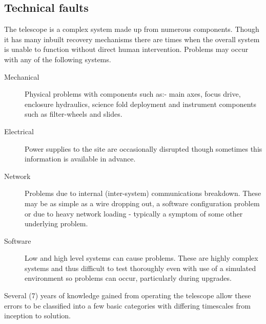 \subsection{Technical faults}
The telescope is a complex system made up from numerous components. Though it has many inbuilt recovery mechanisms there are times when the overall system is unable to function without direct human intervention. Problems may occur with any of the following systems.

\begin{description}
\item [Mechanical] Physical problems with components such as:- main axes, focus drive, enclosure hydraulics, science fold deployment and instrument components such as filter-wheels and slides.

\item [Electrical] Power supplies to the site are occasionally disrupted though sometimes this information is available in advance.

\item [Network] Problems due to internal (inter-system) communications breakdown. These may be as simple as a wire dropping out, a software configuration problem or due to heavy network loading - typically a symptom of some other underlying problem. 

\item [Software] Low and high level systems can cause problems. These are highly complex systems and thus difficult to test thoroughly even with use of a simulated environment so problems can occur, particularly during upgrades. 

\end{description}

Several (7) years of knowledge gained from operating the telescope allow these errors to be classified into a few basic categories with differing timescales from inception to solution.

